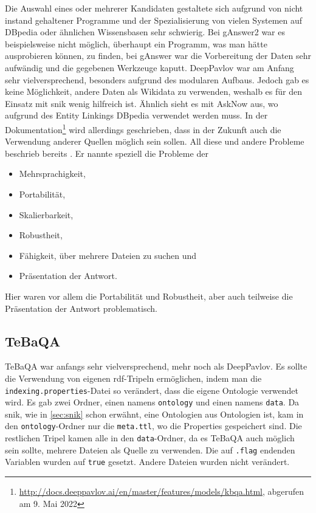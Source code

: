 Die Auswahl eines oder mehrerer Kandidaten gestaltete sich aufgrund von nicht instand gehaltener Programme
und der Spezialisierung von vielen Systemen auf DBpedia oder ähnlichen Wissensbasen sehr schwierig.
Bei gAnswer2 war es beispielsweise nicht möglich, überhaupt ein Programm, was man hätte ausprobieren können, zu finden,
bei gAnswer war die Vorbereitung der Daten sehr aufwändig und die gegebenen Werkzeuge kaputt.
DeepPavlov war am Anfang sehr vielversprechend, besonders aufgrund des modularen Aufbaus.
Jedoch gab es keine Möglichkeit, andere Daten als Wikidata zu verwenden, weshalb es für den Einsatz mit \ac{snik} wenig hilfreich ist.
Ähnlich sieht es mit AskNow aus, wo aufgrund des Entity Linkings DBpedia verwendet werden muss.
In der Dokumentation\footnote{\url{http://docs.deeppavlov.ai/en/master/features/models/kbqa.html}, abgerufen am 9. Mai 2022} wird allerdings geschrieben,
dass in der Zukunft auch die Verwendung anderer Quellen möglich sein sollen.
All diese und andere Probleme beschrieb bereits \citet{diefenbachkbqa}.
Er nannte speziell die Probleme der
\begin{itemize}
  \item Mehrsprachigkeit,
  \item Portabilität,
  \item Skalierbarkeit,
  \item Robustheit,
  \item Fähigkeit, über mehrere Dateien zu suchen und
  \item Präsentation der Antwort.
\end{itemize}
Hier waren vor allem die Portabilität und Robustheit, aber auch teilweise die Präsentation der Antwort problematisch.

\subsection{TeBaQA}

TeBaQA war anfangs sehr vielversprechend, mehr noch als DeepPavlov.
Es sollte die Verwendung von eigenen \ac{rdf}-Tripeln ermöglichen, indem man die \texttt{indexing.properties}-Datei so verändert, dass die eigene Ontologie verwendet wird.
Es gab zwei Ordner, einen namens \texttt{ontology} und einen namens \texttt{data}.
Da \ac{snik}, wie in \cref{sec:snik} schon erwähnt, eine Ontologien aus Ontologien ist, kam in den \texttt{ontology}-Ordner nur die \texttt{meta.ttl}, wo die Properties gespeichert sind.
Die restlichen Tripel kamen alle in den \texttt{data}-Ordner, da es TeBaQA auch möglich sein sollte, mehrere Dateien als Quelle zu verwenden.
Die auf \texttt{.flag} endenden Variablen wurden auf \texttt{true} gesetzt.
Andere Dateien wurden nicht verändert.

